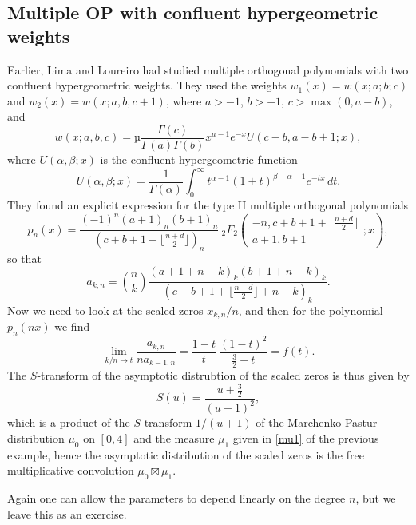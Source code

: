 \documentclass[12pt]{article}
\numberwithin{equation}{section}
\begin{document}
\subsection{Multiple OP with confluent hypergeometric weights}
Earlier, Lima and Loureiro \cite{Lima-Loureiro20} had studied multiple orthogonal polynomials with two confluent hypergeometric weights.
They used the weights $w_1(x) = w(x;a;b;c)$ and $w_2(x) = w(x;a,b,c+1)$, where $a>-1$, $b>-1$, $c> \max(0,a-b)$, and
\[  w(x;a,b,c) = µ\frac{\Gamma(c)}{\Gamma(a)\Gamma(b)} x^{a-1} e^{-x} U(c-b,a-b+1;x),          \]
where $U(\alpha,\beta;x)$ is the confluent hypergeometric function 
\[     U(\alpha,\beta;x) = \frac{1}{\Gamma(\alpha)} \int_0^\infty t^{\alpha-1} (1+t)^{\beta-\alpha-1} e^{-tx}\, dt.  \]
They found an explicit expression for the type II multiple orthogonal polynomials
\[     p_n(x) = \frac{(-1)^n (a+1)_n (b+1)_n}{(c+b+1+\lfloor \frac{n+d}{2} \rfloor )_n} \ {}_2F_2\left( \begin{array}{c} -n,c+b+1+\lfloor \frac{n+d}{2} \rfloor \\
                                                                                                                                                                                                       a+1, b+1 \end{array}; x \right), \]
so that
\[    a_{k,n} = \binom{n}{k} \frac{(a+1+n-k)_k (b+1+n-k)_k}{(c+b+1+\lfloor \frac{n+d}{2}\rfloor +n-k)_k}.  \]
Now we need to look at the scaled zeros $x_{k,n}/n$, and then for the polynomial $p_n(nx)$ we find
\[    \lim_{k/n \to t} \frac{a_{k,n}}{n a_{k-1,n}} = \frac{1-t}{t} \ \frac{(1-t)^2}{\frac32-t} = f(t).  \]
The $S$-transform of the asymptotic distrubtion of the scaled zeros is thus given by
\[    S(u) = \frac{u+\frac32}{(u+1)^2},  \]
which is a product of the $S$-transform $1/(u+1)$ of the Marchenko-Pastur distribution $\mu_0$ on $[0,4]$ and the measure $\mu_1$ given in \eqref{mu1} of the previous example, hence the asymptotic distribution of the scaled zeros is the free multiplicative convolution $\mu_0 \boxtimes \mu_1$.

Again one can allow the parameters to depend linearly on the degree $n$, but we leave this as an exercise.
\end{document}

